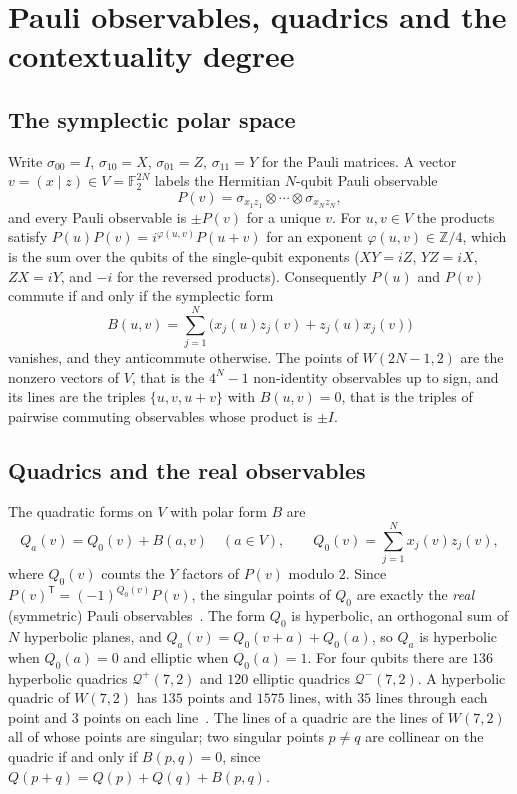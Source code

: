 \documentclass[11pt]{article}
\theoremstyle{definition}
\theoremstyle{remark}
\newcommand{\F}{\mathbb{F}}
\newcommand{\Qp}{\mathcal{Q}^{+}}
\newcommand{\Qm}{\mathcal{Q}^{-}}
\begin{document}
\section{Pauli observables, quadrics and the contextuality degree}\label{sec:prelim}

\subsection{The symplectic polar space}
Write $\sigma_{00}=I$, $\sigma_{10}=X$, $\sigma_{01}=Z$, $\sigma_{11}=Y$ for the Pauli matrices.
A vector $v=(x\mid z)\in V=\F_2^{2N}$ labels the Hermitian $N$-qubit Pauli observable
\[P(v)=\sigma_{x_1z_1}\otimes\cdots\otimes\sigma_{x_Nz_N},\]
and every Pauli observable is $\pm P(v)$ for a unique $v$.
For $u,v\in V$ the products satisfy $P(u)P(v)=i^{\varphi(u,v)}P(u+v)$ for an exponent $\varphi(u,v)\in\mathbb Z/4$, which is the sum over the qubits of the single-qubit exponents ($XY=iZ$, $YZ=iX$, $ZX=iY$, and $-i$ for the reversed products).
Consequently $P(u)$ and $P(v)$ commute if and only if the symplectic form
\[B(u,v)=\sum_{j=1}^N\bigl(x_j(u)z_j(v)+z_j(u)x_j(v)\bigr)\]
vanishes, and they anticommute otherwise.
The points of $W(2N-1,2)$ are the nonzero vectors of $V$, that is the $4^N-1$ non-identity observables up to sign, and its lines are the triples $\{u,v,u+v\}$ with $B(u,v)=0$, that is the triples of pairwise commuting observables whose product is $\pm I$.

\subsection{Quadrics and the real observables}
The quadratic forms on $V$ with polar form $B$ are
\[Q_a(v)=Q_0(v)+B(a,v)\quad(a\in V),\qquad Q_0(v)=\sum_{j=1}^N x_j(v)z_j(v),\]
where $Q_0(v)$ counts the $Y$ factors of $P(v)$ modulo $2$.
Since $P(v)^{\mathsf T}=(-1)^{Q_0(v)}P(v)$, the singular points of $Q_0$ are exactly the \emph{real} (symmetric) Pauli observables~\cite{SanigaLevayPracna12}.
The form $Q_0$ is hyperbolic, an orthogonal sum of $N$ hyperbolic planes, and $Q_a(v)=Q_0(v+a)+Q_0(a)$, so $Q_a$ is hyperbolic when $Q_0(a)=0$ and elliptic when $Q_0(a)=1$.
For four qubits there are $136$ hyperbolic quadrics $\Qp(7,2)$ and $120$ elliptic quadrics $\Qm(7,2)$.
A hyperbolic quadric of $W(7,2)$ has $135$ points and $1575$ lines, with $35$ lines through each point and $3$ points on each line~\cite{HirschfeldThas16}.
The lines of a quadric are the lines of $W(7,2)$ all of whose points are singular; two singular points $p\ne q$ are collinear on the quadric if and only if $B(p,q)=0$, since $Q(p+q)=Q(p)+Q(q)+B(p,q)$.
\end{document}
